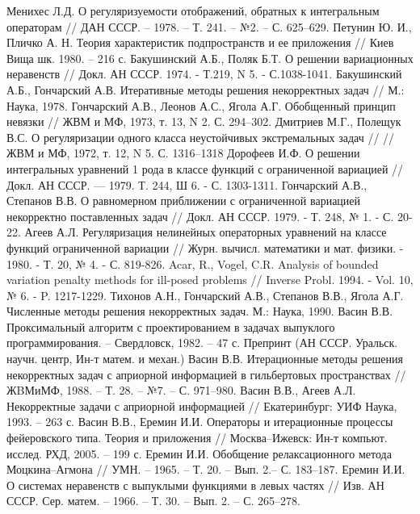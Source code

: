 \documentclass[14pt]{article}
\begin{document}
\begin{thebibliography}{2}
 Менихес Л.Д. О регуляризуемости отображений, обратных к интегральным операторам // ДАН СССР. – 1978. – Т. 241. – №2. – С. 625–629.
Петунин  Ю. И., Пличко А. Н. Теория характеристик подпространств и ее приложения // Киев Вища шк. 1980. -- 216 с.
 Бакушинский А.Б., Поляк Б.Т. О решении вариационных неравенств // Докл. АН СССР. 1974. - Т.219, N 5. - С.1038-1041.
 Бакушинский А.Б., Гончарский А.В. Итеративные методы решения некорректных задач // М.: Наука, 1978.
 Гончарский А.В., Леонов А.С., Ягола А.Г. Обобщенный принцип невязки // ЖВМ и МФ, 1973, т. 13, N 2. С. 294–302.
 Дмитриев М.Г., Полещук В.С. О регуляризации одного класса неустойчивых экстремальных задач // // ЖВМ и МФ, 1972,  т. 12, N 5. С. 1316–1318
 Дорофеев И.Ф. О решении интегральных уравнений 1 рода в классе функций с ограниченной вариацией // Докл. АН СССР. — 1979. Т. 244, Ш 6. - С. 1303-1311.
Гончарский А.В., Степанов В.В. О равномерном приближении с ограниченной вариацией некорректно поставленных задач // Докл. АН СССР. 1979. - Т. 248, № 1. - С. 20-22.
 Агеев А.Л. Регуляризация нелинейных операторных уравнений на классе функций ограниченной вариации // Журн. вычисл. математики и мат. физики. - 1980. - Т. 20, № 4. - С. 819-826.
 Acar, R., Vogel, C.R. Analysis of bounded variation penalty methods for ill-posed problems // Inverse Probl. 1994. - Vol. 10, № 6. - P. 1217-1229.
 Тихонов А.Н., Гончарский А.В., Степанов В.В., Ягола А.Г. Численные методы решения некорректных задач. М.: Наука, 1990.
 Васин В.В. Проксимальный алгоритм с проектированием в задачах выпуклого программирования. –
Свердловск, 1982. – 47 с. Препринт (АН СССР. Уральск. научн. центр, Ин-т матем. и механ.)
 Васин В.В. Итерационные методы решения некорректных задач с априорной информацией в гильбертовых пространствах // ЖBМиМФ, 1988. – Т. 28. – №7. – С. 971–980.
 Васин В.В., Агеев А.Л. Некорректные задачи с априорной информацией // Екатеринбург: УИФ Наука, 1993. – 263 с.
 Васин В.В., Еремин И.И. Операторы и итерационные процессы фейеровского типа. Теория и приложения // Москва–Ижевск: Ин-т компьют. исслед. РХД, 2005. – 199 с.
 Еремин И.И. Обобщение релаксационного метода Моцкина–Агмона // УМН. – 1965. – Т. 20. – Вып. 2.– С. 183–187.
 Еремин И.И. О системах неравенств с выпуклыми функциями в левых частях // Изв. АН СССР. Сер. матем. – 1966. – Т. 30. – Вып. 2. – С. 265–278.

\end{thebibliography}
\end{document}
